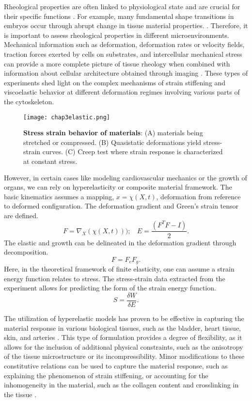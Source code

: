 Rheological properties are often linked to physiological state and are crucial for their specific functions \cite{park2015, vedula2012}. For example, many fundamental shape transitions in embryos occur through abrupt change in tissue material properties. \cite{hannezo2022}. Therefore, it is important to assess rheological properties in different microenvironments. Mechanical information such as deformation, deformation rates or velocity fields, traction forces exerted by cells on substrates, and intercellular mechanical stress can provide a more complete picture of tissue rheology when combined with information about cellular architecture obtained through imaging \cite{roca-cusachs2017}. These types of experiments shed light on the complex mechanisms of strain stiffening and viscoelastic behavior at different deformation regimes involving various parts of the cytoskeleton.

\begin{figure}
	\centering
	\texttt{[image: chap3elastic.png]}
	\caption{\label{fig_3_8} \textbf{Stress strain behavior of materials}: (A) materials being stretched or compressed. (B) Quasistatic deformations yield stress-strain curves. (C) Creep test where strain response is characterized at constant stress.
	}
\end{figure}

However, in certain cases like modeling cardiovascular mechanics or the growth of organs, we can rely on hyperelasticity or composite material framework. The basic kinematics assumes a mapping, \(x = \chi (X, t)\), deformation from reference to deformed configuration. The deformation gradient and Green's strain tensor are defined. 
$$ F = \nabla_X (\chi(X, t)));\ \ \ \ E = \frac{(F^T F - I)}{2}. $$ 
The elastic and growth can be delineated in the deformation gradient through decomposition. \[ F = F_e F_g .\] Here, in the theoretical framework of finite elasticity, one can assume a strain energy function relates to stress. The stress-strain data extracted from the experiment allows for predicting the form of the strain energy function. \[ S = \frac{\delta W}{\delta E}.\]

The utilization of hyperelastic models has proven to be effective in capturing the material response in various biological tissues, such as the bladder, heart tissue, skin, and arteries \cite{holzapfel2000}. This type of formulation provides a degree of flexibility, as it allows for the inclusion of additional physical constraints, such as the anisotropy of the tissue microstructure or its incompressibility. Minor modifications to these constitutive relations can be used to capture the material response, such as explaining the phenomenon of strain stiffening, or accounting for the inhomogeneity in the material, such as the collagen content and crosslinking in the tissue \cite{holzapfel2019}.

